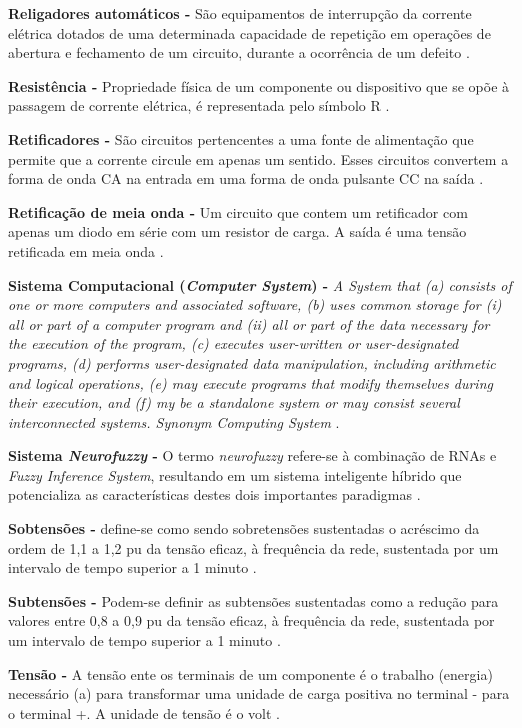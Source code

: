\noindent
\textbf{Religadores automáticos -} São equipamentos de interrupção da corrente elétrica dotados de uma determinada capacidade de repetição em operações de abertura e fechamento de um circuito, durante a ocorrência de um defeito \cite{FIL05}. 

\noindent
\textbf{Resistência -} Propriedade física de um componente ou dispositivo que se opõe à passagem de corrente elétrica, é representada pelo símbolo R \cite{DOR08}.

\noindent
\textbf{Retificadores -} São circuitos pertencentes a uma fonte de alimentação que permite que a corrente circule em apenas um sentido. Esses circuitos convertem a forma de onda CA na entrada em uma forma de onda pulsante CC na saída \cite{MAL07}.

\noindent
\textbf{Retificação de meia onda -} Um circuito que contem um retificador com apenas um diodo em série com um resistor de carga. A saída é uma tensão retificada em meia onda \cite{MAL07}.

\noindent
\textbf{Sistema Computacional (\textit{Computer System}) -} \textit{A System that (a) consists of one or more computers and associated software, (b) uses common storage for (i) all or part of a computer program and (ii) all or part of the data necessary for the execution of the program, (c) executes user-written or user-designated programs, (d) performs user-designated data manipulation, including arithmetic and logical operations, (e) may execute programs that modify themselves during their execution, and (f) my be a standalone system or may consist several interconnected systems. Synonym Computing System} \cite{WEI00}.

\noindent
\textbf{Sistema \textit{Neurofuzzy} -} O termo \textit{neurofuzzy} refere-se à combinação de RNAs e \textit{Fuzzy Inference System}, resultando em um sistema inteligente híbrido que potencializa as características destes dois importantes paradigmas \cite{JAC10}.

\noindent
\textbf{Sobtensões -} define-se como sendo sobretensões sustentadas o acréscimo da ordem de 1,1 a 1,2 pu da tensão eficaz, à frequência da rede, sustentada por um intervalo de tempo superior a 1 minuto \cite{JUN09}.

\noindent
\textbf{Subtensões -} Podem-se definir as subtensões sustentadas como a redução para valores entre 0,8 a 0,9 pu da tensão eficaz, à frequência da rede, sustentada por um intervalo de tempo superior a 1 minuto \cite{JUN09}.

\noindent
\textbf{Tensão -} A tensão ente os terminais de um componente é o trabalho (energia) necessário (a) para transformar uma unidade de carga positiva no terminal - para o terminal +. A unidade de tensão é o volt \cite{DOR08}.

